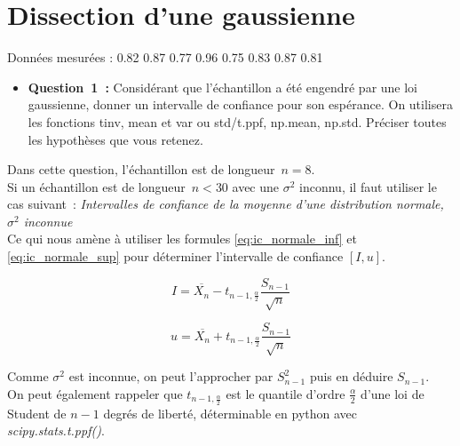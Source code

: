 \section{Dissection d’une gaussienne}
\vspace{.2cm}

\noindent
Données mesurées : 0.82 0.87 0.77 0.96 0.75 0.83 0.87 0.81

\begin{itemize}[label={},itemindent=-2em,leftmargin=2em]
    \item \textbf{Question~1~:} Considérant que l’échantillon a été engendré par une loi gaussienne, donner un intervalle
    de confiance pour son espérance. On utilisera les fonctions tinv, mean et var ou std/t.ppf, np.mean,
    np.std. Préciser toutes les hypothèses que vous retenez.
\end{itemize}
\vspace{.2cm}

\noindent
Dans cette question, l'échantillon est de longueur~$n=8$. \\
Si un échantillon est de longueur~$n<30$ avec une $\sigma^{2}$ inconnu, il faut utiliser le cas suivant~: 
\textit{Intervalles de confiance de la moyenne d’une distribution normale, $\sigma^{2}$ inconnue} \\

\noindent
Ce qui nous amène à utiliser les formules \ref*{eq:ic_normale_inf} et \ref*{eq:ic_normale_sup} pour déterminer l'intervalle de confiance $[I, u]$. 

\begin{figure}[!h]
    \centering
    \begin{minipage}{.48\linewidth}
        \begin{equation}
            I = \overline{X_{n}} - t_{n-1,\frac{\alpha}{2}} \frac{S_{n-1}}{\sqrt{n}}
            \label{eq:ic_normale_inf}
        \end{equation}
    \end{minipage}\hfill\vline
    \begin{minipage}{.48\linewidth}
        \begin{equation}
            u = \overline{X_{n}} + t_{n-1,\frac{\alpha}{2}} \frac{S_{n-1}}{\sqrt{n}}
            \label{eq:ic_normale_sup}
        \end{equation}
    \end{minipage}
\end{figure}

\noindent
Comme $\sigma^{2}$ est inconnue, on peut l'approcher par $S_{n-1}^{2}$ puis en déduire $S_{n-1}$. \\
On peut également rappeler que $t_{n-1,\frac{\alpha}{2}}$ est le quantile d’ordre $\frac{\alpha}{2}$ d’une loi de Student de $n - 1$ degrés de liberté, déterminable en python avec \textit{scipy.stats.t.ppf()}.


